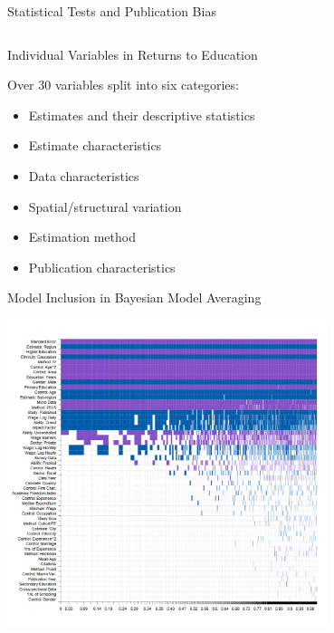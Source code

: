 \documentclass{beamer} %
\begin{document}
\begin{frame}{Statistical Tests and Publication Bias}
\begin{tiny}
\begin{table}[!t]
\begin{tabular}{
                @{}l*{6}{c}
                }
                \bottomrule
            \end{tabular}
        \end{table}

    \end{tiny}
\end{frame}






\begin{frame}{Individual Variables in Returns to Education}

    Over 30 variables split into six categories:
    \vspace{0.3cm}

    \begin{itemize}
        \item Estimates and their descriptive statistics
        \item Estimate characteristics
        \item Data characteristics
        \item Spatial/structural variation
        \item Estimation method
        \item Publication characteristics
    \end{itemize}

\end{frame}


\begin{frame}{Model Inclusion in Bayesian Model Averaging}
    \begin{center}
        \includegraphics[width=0.7\textwidth]{Figures/bma_UIP_dilut_results.png}
    \end{center}
\end{frame}
\end{document}
